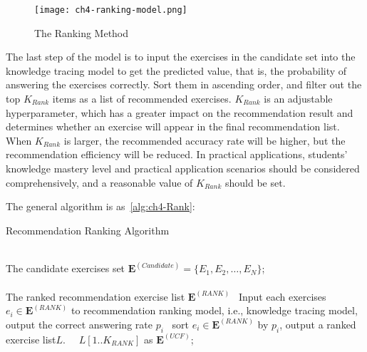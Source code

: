 \begin{figure}[htbp!]
  \centering
  \texttt{[image: ch4-ranking-model.png]}
  \caption{The Ranking Method}\label{fig:ch4-ranking-1}
\end{figure}


The last step of the model is to input the exercises in the candidate set into the knowledge tracing model to get the predicted value, that is, the probability of answering the exercises correctly. Sort them in ascending order, and filter out the top \(K_{Rank}\) items as a list of recommended exercises. \(K_{Rank}\) is an adjustable hyperparameter, which has a greater impact on the recommendation result and determines whether an exercise will appear in the final recommendation list. When \(K_{Rank}\) is larger, the recommended accuracy rate will be higher, but the recommendation efficiency will be reduced. In practical applications, students' knowledge mastery level and practical application scenarios should be considered comprehensively, and a reasonable value of \(K_{Rank}\) should be set.

The general algorithm is as~\ref{alg:ch4-Rank}:
\begin{algorithm}[htbp!]
  \caption{Recommendation Ranking Algorithm}\label{alg:ch4-Rank}
  \begin{algorithmic}
    \REQUIRE~~\\
    The candidate exercises set \(\mathbf{E}^{(Candidate)}=\{E_1,E_2,\ldots,E_N\} \); \\
    \ENSURE~~\\ %
    The ranked recommendation exercise list \(\mathbf{E}^{(RANK)} \)
    \STATE~Input each exercises \(e_i \in \mathbf{E}^{(RANK)} \) to recommendation ranking model, i.e., knowledge tracing model, output the correct answering rate \(p_i\)
    \STATE~sort \(e_i \in \mathbf{E}^{(RANK)} \) by \(p_i\), output a ranked exercise list\(L\).
    \RETURN~~\(L[1..K_{RANK}]\) as \(\mathbf{E}^{(UCF)} \); %
  \end{algorithmic}
\end{algorithm}

